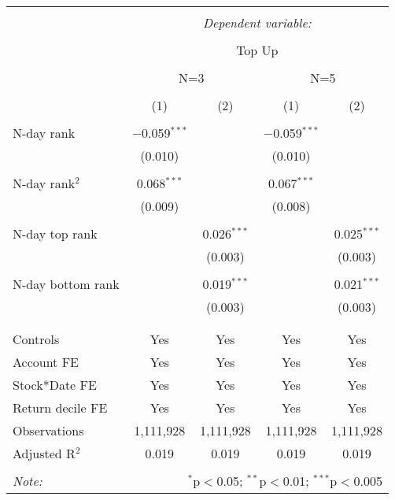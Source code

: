 
\begin{table}[!htbp] \centering 
	\caption{} 
	\label{} 
	\begin{tabular}{@{\extracolsep{5pt}}lcccc} 
		\\[-1.8ex]\hline 
		\hline \\[-1.8ex] 
		& \multicolumn{4}{c}{\textit{Dependent variable:}} \\ 
		\cline{2-5} 
		\\[-1.8ex] & \multicolumn{4}{c}{Top Up} \\ 
		\\[-1.8ex] & \multicolumn{2}{c}{N=3}& \multicolumn{2}{c}{N=5} \\
		\cmidrule(lr){2-3}
		\cmidrule(lr){4-5}
		\\[-1.8ex] & (1) & (2) & (1) & (2)\\ 
		\hline \\[-1.8ex] 
		
		
 N-day rank & $-$0.059$^{***}$ &  & $-$0.059$^{***}$ &  \\ 
& (0.010) &  & (0.010) &  \\ 
& & & & \\ 
N-day rank$^2$ & 0.068$^{***}$ &  & 0.067$^{***}$ &  \\ 
& (0.009) &  & (0.008) &  \\ 
& & & & \\ 
N-day top rank &  & 0.026$^{***}$ &  & 0.025$^{***}$ \\ 
&  & (0.003) &  & (0.003) \\ 
& & & & \\ 
N-day bottom rank &  & 0.019$^{***}$ &  & 0.021$^{***}$ \\ 
&  & (0.003) &  & (0.003) \\ 
& & & & \\ 	
\hline \\[-1.8ex] 	
Controls & Yes & Yes & Yes & Yes \\ 
Account FE & Yes & Yes & Yes & Yes \\ 
Stock*Date FE & Yes & Yes & Yes & Yes \\ 
Return decile FE & Yes & Yes & Yes & Yes \\ 
Observations & 1,111,928 & 1,111,928 & 1,111,928 & 1,111,928 \\ 
Adjusted R$^{2}$ & 0.019 & 0.019 & 0.019 & 0.019 \\ 
\hline 
\hline \\[-1.8ex] 
\textit{Note:}  & \multicolumn{4}{r}{$^{*}$p$<$0.05; $^{**}$p$<$0.01; $^{***}$p$<$0.005} \\ 
\end{tabular} 
\end{table} 
